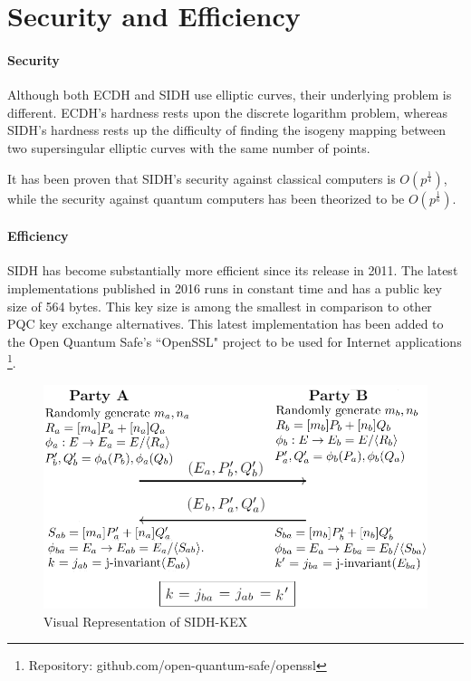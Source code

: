 \documentclass[10pt,twocolumn]{article} %
\begin{document}
\section{Security and Efficiency}
\paragraph{Security} Although both ECDH and SIDH use elliptic curves, their underlying problem is different. ECDH's hardness rests upon the discrete logarithm problem, whereas SIDH's hardness rests up the difficulty of finding the isogeny mapping between two supersingular elliptic curves with the same number of points. 
\par It has been proven \cite{delfs2016computing,biasse2014quantum} that SIDH's security against classical computers is $O(p^\frac{1}{4})$, while the security against quantum computers has been theorized to be  $O(p^\frac{1}{6})$.
\paragraph{Efficiency} SIDH has become substantially more efficient since its release in 2011. The latest implementations published in 2016 runs in constant time and has a public key size of 564 bytes. This key size is among the smallest in comparison to other PQC key exchange alternatives. This latest implementation has been added to the Open Quantum Safe's ``OpenSSL" project to be used for Internet applications \footnote{Repository: github.com/open-quantum-safe/openssl}.

\begin{figure}[t]
	\centering
	\includegraphics[width=1.02\linewidth]{sidh}
	\caption{Visual Representation of SIDH-KEX}
	\label{fig:sidh}
\end{figure}
\end{document}
